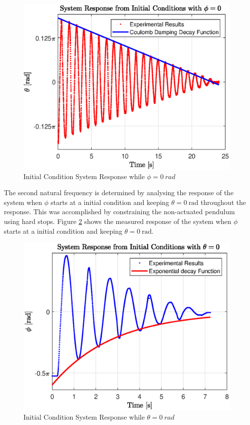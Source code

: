 \begin{figure}[h]
	\centering
	\includegraphics[scale=1]{./figs/q1_initial_response.eps}
	\caption{Initial Condition System Response while $ \phi = \SI{0}{rad} $ }
	\label{fig:q1_response}
\end{figure}


The second natural frequency is determined by analysing the response of the system when $\phi$ starts at a initial condition and keeping $\theta = \SI{0}{\radian}$ throughout the response. This was accomplished by constraining the non-actuated pendulum using hard stops. Figure \ref{fig:q2_response} shows the measured response of the system when $\phi$ starts at a initial condition and keeping $\theta = \SI{0}{\radian} $.\\

\begin{figure}[h]
	\centering
	\includegraphics[scale=1]{./figs/q2_initial_response.eps}
	\caption{Initial Condition System Response while $ \theta = \SI{0}{rad} $ }
	\label{fig:q2_response}
\end{figure}

